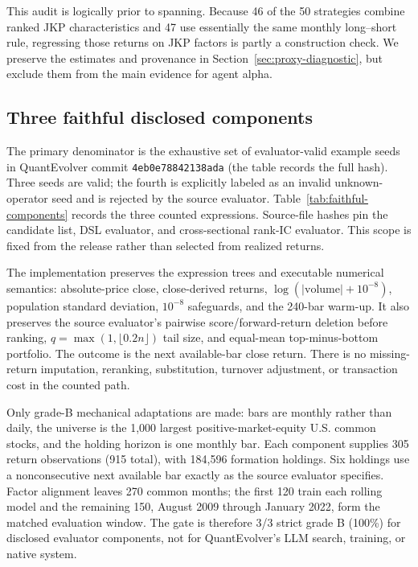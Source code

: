 \documentclass[sigconf,anonymous]{acmart}
\begin{document}
This audit is logically prior to spanning. Because 46 of the 50 strategies combine ranked JKP characteristics and 47 use essentially the same monthly long--short rule, regressing those returns on JKP factors is partly a construction check. We preserve the estimates and provenance in Section~\ref{sec:proxy-diagnostic}, but exclude them from the main evidence for agent alpha.

\subsection{Three faithful disclosed components}

The primary denominator is the exhaustive set of evaluator-valid example seeds in QuantEvolver commit \texttt{4eb0e78842138ada} (the table records the full hash). Three seeds are valid; the fourth is explicitly labeled as an invalid unknown-operator seed and is rejected by the source evaluator. Table~\ref{tab:faithful-components} records the three counted expressions. Source-file hashes pin the candidate list, DSL evaluator, and cross-sectional rank-IC evaluator. This scope is fixed from the release rather than selected from realized returns.

The implementation preserves the expression trees and executable numerical semantics: absolute-price close, close-derived returns, $\log(|\mathrm{volume}|+10^{-8})$, population standard deviation, $10^{-8}$ safeguards, and the 240-bar warm-up. It also preserves the source evaluator's pairwise score/forward-return deletion before ranking, $q=\max(1,\lfloor 0.2n\rfloor)$ tail size, and equal-mean top-minus-bottom portfolio. The outcome is the next available-bar close return. There is no missing-return imputation, reranking, substitution, turnover adjustment, or transaction cost in the counted path.

Only grade-B mechanical adaptations are made: bars are monthly rather than daily, the universe is the 1,000 largest positive-market-equity U.S. common stocks, and the holding horizon is one monthly bar. Each component supplies 305 return observations (915 total), with 184,596 formation holdings. Six holdings use a nonconsecutive next available bar exactly as the source evaluator specifies. Factor alignment leaves 270 common months; the first 120 train each rolling model and the remaining 150, August 2009 through January 2022, form the matched evaluation window. The gate is therefore 3/3 strict grade B (100\%) for disclosed evaluator components, not for QuantEvolver's LLM search, training, or native system.
\end{document}
